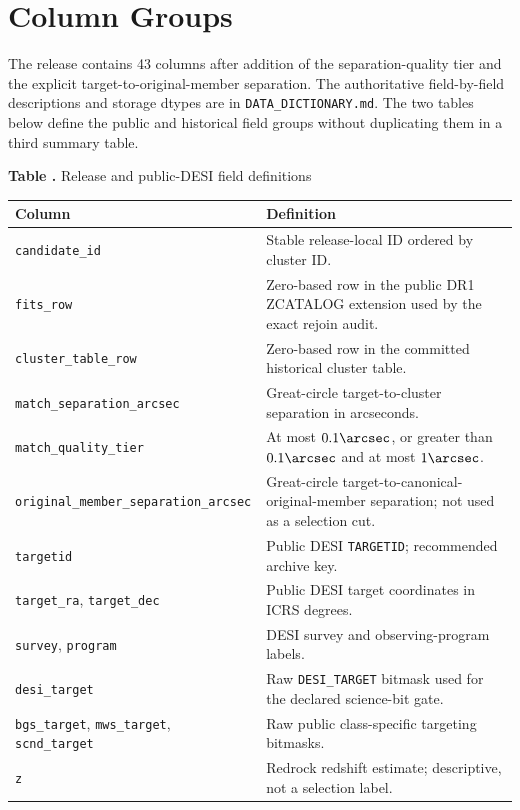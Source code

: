 \documentclass[twocolumn,linenumbers]{aastex702}
\begin{document}
\section{Column Groups}\label{app:columns}

The release contains 43 columns after addition of the separation-quality tier and the explicit
target-to-original-member separation.  The authoritative
field-by-field descriptions and storage dtypes are in \texttt{DATA\_DICTIONARY.md}.  The two
tables below define the public and historical field groups without duplicating them in a third
summary table.

\clearpage
{}\label{tab:public-fields}
\begin{center}
\textbf{Table \thetable.} Release and public-DESI field definitions

\smallskip
\scriptsize
\begin{tabular}{p{}p{}}
\toprule
Column & Definition \\
\midrule
\texttt{candidate\_id} & Stable release-local ID ordered by cluster ID. \\
\texttt{fits\_row} & Zero-based row in the public DR1 ZCATALOG extension used by the exact rejoin audit. \\
\texttt{cluster\_table\_row} & Zero-based row in the committed historical cluster table. \\
\texttt{match\_separation\_arcsec} & Great-circle target-to-cluster separation in arcseconds. \\
\texttt{match\_quality\_tier} & At most $0.1\arcsec$, or greater than $0.1\arcsec$ and at most $1\arcsec$. \\
\texttt{original\_member\_separation\_arcsec} & Great-circle target-to-canonical-original-member separation; not used as a selection cut. \\
\texttt{targetid} & Public DESI \texttt{TARGETID}; recommended archive key. \\
\texttt{target\_ra}, \texttt{target\_dec} & Public DESI target coordinates in ICRS degrees. \\
\texttt{survey}, \texttt{program} & DESI survey and observing-program labels. \\
\texttt{desi\_target} & Raw \texttt{DESI\_TARGET} bitmask used for the declared science-bit gate. \\
\texttt{bgs\_target}, \texttt{mws\_target}, \texttt{scnd\_target} & Raw public class-specific targeting bitmasks. \\
\texttt{z} & Redrock redshift estimate; descriptive, not a selection label. \\

\end{tabular}
\end{center}
\end{document}
